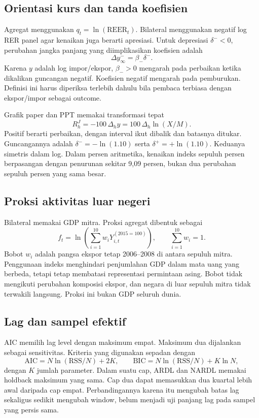 \subsection{Orientasi kurs dan tanda koefisien}
Agregat menggunakan $q_t=\ln(\mathrm{REER}_t)$. Bilateral menggunakan negatif log RER panel agar kenaikan juga berarti apresiasi. Untuk depresiasi $\delta^-<0$, perubahan jangka panjang yang diimplikasikan koefisien adalah
\begin{equation}
 \Delta y_\infty^-=\beta_-\delta^-.
\end{equation}
Karena $y$ adalah log impor/ekspor, $\beta_->0$ mengarah pada perbaikan ketika dikalikan guncangan negatif. Koefisien negatif mengarah pada pemburukan. Definisi ini harus diperiksa terlebih dahulu bila pembaca terbiasa dengan ekspor/impor sebagai outcome.

Grafik paper dan PPT memakai transformasi tepat
\begin{equation}
 R_h^J=-100\,\Delta_h y=100\,\Delta_h\ln(X/M).\label{eq:display}
\end{equation}
Positif berarti perbaikan, dengan interval ikut dibalik dan batasnya ditukar. Guncangannya adalah $\delta^-=-\ln(1.10)$ serta $\delta^+=+\ln(1.10)$. Keduanya simetris dalam log. Dalam persen aritmetika, kenaikan indeks sepuluh persen berpasangan dengan penurunan sekitar 9,09 persen, bukan dua perubahan sepuluh persen yang sama besar.

\subsection{Proksi aktivitas luar negeri}
Bilateral memakai GDP mitra. Proksi agregat dibentuk sebagai
\begin{equation}
 f_t=\ln\left(\sum_{i=1}^{10}w_iY^{(2015=100)}_{i,t}\right),
 \qquad \sum_{i=1}^{10}w_i=1.
\end{equation}
Bobot $w_i$ adalah pangsa ekspor tetap 2006--2008 di antara sepuluh mitra. Penggunaan indeks menghindari penjumlahan GDP dalam mata uang yang berbeda, tetapi tetap membatasi representasi permintaan asing. Bobot tidak mengikuti perubahan komposisi ekspor, dan negara di luar sepuluh mitra tidak terwakili langsung. Proksi ini bukan GDP seluruh dunia.

\subsection{Lag dan sampel efektif}
AIC memilih lag level dengan maksimum empat. Maksimum dua dijalankan sebagai sensitivitas. Kriteria yang digunakan sepadan dengan
\begin{equation}
 \mathrm{AIC}=N\ln(\mathrm{RSS}/N)+2K,\qquad
 \mathrm{BIC}=N\ln(\mathrm{RSS}/N)+K\ln N,
\end{equation}
dengan $K$ jumlah parameter. Dalam suatu cap, ARDL dan NARDL memakai holdback maksimum yang sama. Cap dua dapat memasukkan dua kuartal lebih awal daripada cap empat. Perbandingannya karena itu mengubah batas lag sekaligus sedikit mengubah window, belum menjadi uji panjang lag pada sampel yang persis sama.

